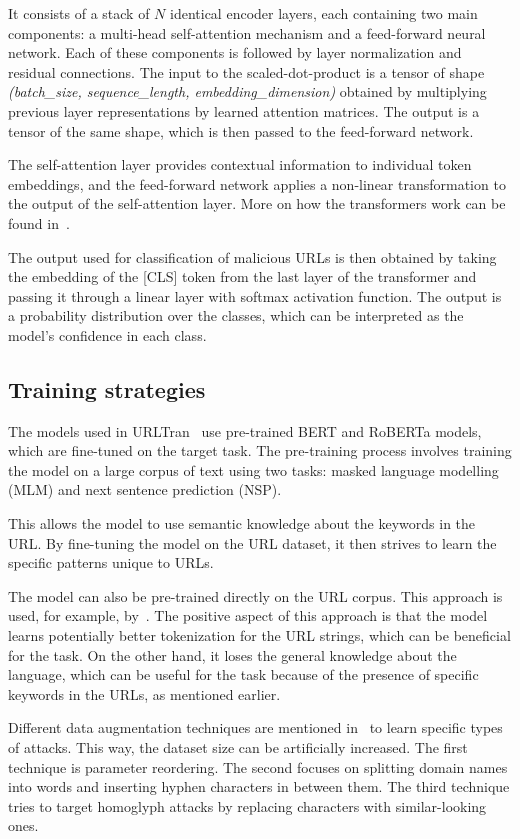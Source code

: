 It consists of a stack of $N$ identical encoder layers, each containing two main components: a multi-head self-attention mechanism and a feed-forward neural network. Each of these components is followed by layer normalization and residual connections. The input to the scaled-dot-product is a tensor of shape \textit{(batch\_size, sequence\_length, embedding\_dimension)} obtained by multiplying previous layer representations by learned attention matrices. The output is a tensor of the same shape, which is then passed to the feed-forward network.

The self-attention layer provides contextual information to individual token embeddings, and the feed-forward network applies a non-linear transformation to the output of the self-attention layer. More on how the transformers work can be found in~\cite{AttentionIsAllYouNeed,RoBERTa}.

The output used for classification of malicious URLs is then obtained by taking the embedding of the [CLS] token from the last layer of the transformer and passing it through a linear layer with softmax activation function. The output is a probability distribution over the classes, which can be interpreted as the model's confidence in each class.

\subsection{Training strategies}
The models used in URLTran~\cite{URLTran} use pre-trained BERT and RoBERTa models, which are fine-tuned on the target task. The pre-training process involves training the model on a large corpus of text using two tasks: masked language modelling (MLM) and next sentence prediction (NSP).

This allows the model to use semantic knowledge about the keywords in the URL. By fine-tuning the model on the URL dataset, it then strives to learn the specific patterns unique to URLs.

The model can also be pre-trained directly on the URL corpus. This approach is used, for example, by~\cite{urlbert}. The positive aspect of this approach is that the model learns potentially better tokenization for the URL strings, which can be beneficial for the task. On the other hand, it loses the general knowledge about the language, which can be useful for the task because of the presence of specific keywords in the URLs, as mentioned earlier.

Different data augmentation techniques are mentioned in~\cite{URLTran} to learn specific types of attacks. This way, the dataset size can be artificially increased. The first technique is parameter reordering. The second focuses on splitting domain names into words and inserting hyphen characters in between them. The third technique tries to target homoglyph attacks by replacing characters with similar-looking ones.

